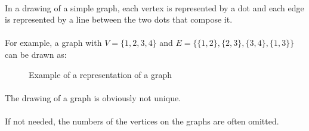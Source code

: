 \paragraph{}
In a drawing of a simple graph, each vertex is represented by a dot and each edge is represented by a line between the two dots that compose it.

\paragraph{}
For example, a graph with $V = \{1,2,3,4\}$ and $E = \{\{1,2\}, \{2,3\}, \{3,4\}, \{1,3\}\}$ can be drawn as:

\begin{figure}[H]
  \begin{center}
    \caption{Example of a representation of a graph}
  \end{center}
\end{figure}

\paragraph{}
The drawing of a graph is obviously not unique.

\paragraph{}
If not needed, the numbers of the vertices on the graphs are often omitted.

